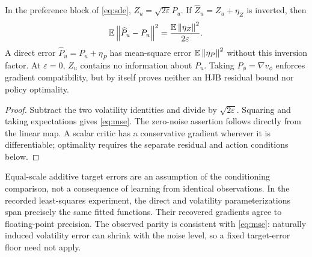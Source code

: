 \begin{lemma}\label{lem:conditioning}
In the preference block of \eqref{eq:sde}, $Z_u=\sqrt{2\varepsilon}P_u$. If $\widehat Z_u=Z_u+\eta_Z$ is inverted, then
\begin{equation}\label{eq:mse}
 \mathbb E\left\lVert\widehat P_u-P_u\right\rVert^2=\frac{\mathbb E\left\lVert\eta_Z\right\rVert^2}{2\varepsilon}.
\end{equation}
A direct error $\widehat P_u=P_u+\eta_P$ has mean-square error $\mathbb E\left\lVert\eta_P\right\rVert^2$ without this inversion factor. At $\varepsilon=0$, $Z_u$ contains no information about $P_u$. Taking $P_\phi=\nabla v_\phi$ enforces gradient compatibility, but by itself proves neither an HJB residual bound nor policy optimality.
\end{lemma}
\begin{proof}
Subtract the two volatility identities and divide by $\sqrt{2\varepsilon}$. Squaring and taking expectations gives \eqref{eq:mse}. The zero-noise assertion follows directly from the linear map. A scalar critic has a conservative gradient wherever it is differentiable; optimality requires the separate residual and action conditions below.\end{proof}

Equal-scale additive target errors are an assumption of the conditioning comparison, not a consequence of learning from identical observations. In the recorded least-squares experiment, the direct and volatility parameterizations span precisely the same fitted functions. Their recovered gradients agree to floating-point precision. The observed parity is consistent with \eqref{eq:mse}: naturally induced volatility error can shrink with the noise level, so a fixed target-error floor need not apply.

